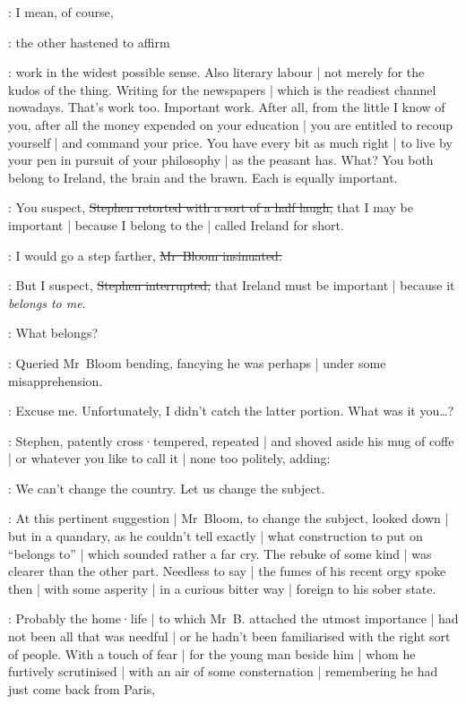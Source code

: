 \Bloom:
I mean,
of course,

:
the other hastened to affirm

\Bloom:
work in the widest possible sense.
Also literary labour |
not merely for the kudos of the thing.
Writing for the newspapers |
which is the readiest channel nowadays.
That's work too.
Important work.
After all,
from the little I know of you,
after all the money expended on your education |
you are entitled to recoup yourself |
and command your price.
You have every bit as much right |
to live by your pen in pursuit of your philosophy |
as the peasant has.
What?
You both belong to Ireland,
the brain and the brawn.
Each is equally important.

\Stephen:
You suspect,
\sout{Stephen retorted with a sort of a half laugh,}
that I may be important |
because I belong to the  |
called Ireland for short.

\Bloom:
I would go a step farther,
\sout{Mr~Bloom insinuated.}

\Stephen:
But I suspect,
\sout{Stephen interrupted,}
that Ireland must be important |
because it \emph{belongs to me}.

\Bloom:
What belongs?

:
Queried Mr~Bloom bending,
fancying he was perhaps |
under some misapprehension.

\Bloom:
Excuse me.
Unfortunately,
I didn't catch the latter portion.
What was it you\ldots?

:
Stephen,
patently cross·tempered,
repeated |
and shoved aside his mug of coffe |
or whatever you like to call it |
none too politely,
adding:

\Stephen:
We can't change the country.
Let us change the subject.

:
At this pertinent suggestion |
Mr~Bloom,
to change the subject,
looked down |
but in a quandary,
as he couldn't tell exactly |
what construction to put on “belongs to” |
which sounded rather a far cry.
The rebuke of some kind |
was clearer than the other part.
Needless to say |
the fumes of his recent orgy spoke then |
with some asperity |
in a curious bitter way |
foreign to his sober state.

:
Probably the home·life |
to which Mr~B.
attached the utmost importance |
had not been all that was needful |
or he hadn't been familiarised with the right sort of people.
With a touch of fear |
for the young man beside him |
whom he furtively scrutinised |
with an air of some consternation |
remembering he had just come back from Paris,

